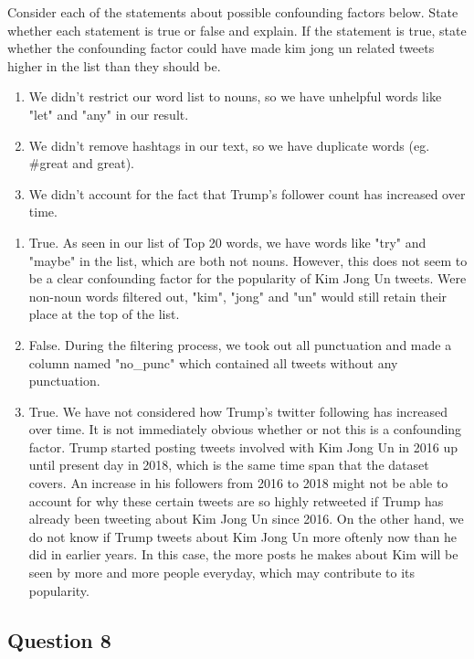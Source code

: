\documentclass[11pt]{article}
\providecommand{\tightlist}{%
      \setlength{\itemsep}{0pt}\setlength{\parskip}{0pt}}
\begin{document}
Consider each of the statements about possible confounding factors
below. State whether each statement is true or false and explain. If the
statement is true, state whether the confounding factor could have made
kim jong un related tweets higher in the list than they should be.

\begin{enumerate}
\def\labelenumi{\arabic{enumi}.}
\tightlist
\item
  We didn't restrict our word list to nouns, so we have unhelpful words
  like "let" and "any" in our result.
\item
  We didn't remove hashtags in our text, so we have duplicate words (eg.
  \#great and great).
\item
  We didn't account for the fact that Trump's follower count has
  increased over time.
\end{enumerate}

    \begin{enumerate}
\def\labelenumi{\arabic{enumi}.}
\tightlist
\item
  True. As seen in our list of Top 20 words, we have words like "try"
  and "maybe" in the list, which are both not nouns. However, this does
  not seem to be a clear confounding factor for the popularity of Kim
  Jong Un tweets. Were non-noun words filtered out, "kim", "jong" and
  "un" would still retain their place at the top of the list.
\item
  False. During the filtering process, we took out all punctuation and
  made a column named "no\_punc" which contained all tweets without any
  punctuation.
\item
  True. We have not considered how Trump's twitter following has
  increased over time. It is not immediately obvious whether or not this
  is a confounding factor. Trump started posting tweets involved with
  Kim Jong Un in 2016 up until present day in 2018, which is the same
  time span that the dataset covers. An increase in his followers from
  2016 to 2018 might not be able to account for why these certain tweets
  are so highly retweeted if Trump has already been tweeting about Kim
  Jong Un since 2016. On the other hand, we do not know if Trump tweets
  about Kim Jong Un more oftenly now than he did in earlier years. In
  this case, the more posts he makes about Kim will be seen by more and
  more people everyday, which may contribute to its popularity.
\end{enumerate}

    \subsection{Question 8}\label{question-8}
\end{document}
